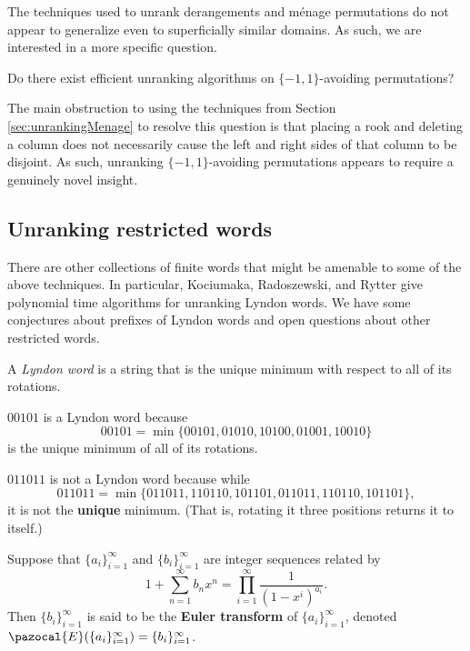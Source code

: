 The techniques used to unrank derangements and m\'enage permutations do
not appear to generalize even to superficially similar domains.
As such, we are interested in a more specific question.
\begin{openquestion}
  Do there exist efficient unranking algorithms on $\{-1, 1\}$-avoiding
  permutations?
\end{openquestion}

The main obstruction to using the techniques from
Section \ref{sec:unrankingMenage} to resolve this question is that placing
a rook and deleting a column does not necessarily cause the left and right
sides of that column to be disjoint. As such, unranking $\{-1,1\}$-avoiding
permutations appears to require a genuinely novel insight.

\subsection{Unranking restricted words}
There are other collections of finite words that might be amenable to some of
the above techniques. In particular, Kociumaka, Radoszewski, and Rytter
\cite{Kociumaka2014} give polynomial time algorithms for unranking Lyndon
words. We have some conjectures about prefixes of Lyndon words and open
questions about other restricted words.
\begin{definition}
  A \textit{Lyndon word} is a string that is the unique minimum with respect
  to all of its rotations.
\end{definition}
\begin{example}
  $00101$ is a Lyndon word because \[
    00101 = \min\{00101, 01010, 10100, 01001, 10010\}
  \] is the unique minimum of all of its rotations.

  $011011$ is not a Lyndon word because while \[
    011011 = \min\{011011, 110110, 101101, 011011, 110110, 101101\},
  \]
  it is not the \textbf{unique} minimum.
  (That is, rotating it three positions returns it to itself.)
\end{example}

\begin{definition}
  Suppose that $\{a_i\}_{i=1}^\infty$ and $\{b_i\}_{i=1}^\infty$ are integer sequences
  related by \[
    1 + \sum_{n=1}^\infty b_n x^n = \prod_{i=1}^\infty \frac{1}{(1-x^i)^{a_i}}.
  \] Then $\{b_i\}_{i=1}^\infty$ is said to be the
  \textbf{Euler transform} of $\{a_i\}_{i=1}^\infty$, denoted
  $\pazocal{E}(\{a_i\}_{i=1}^\infty) = \{b_i\}_{i=1}^\infty$.
\end{definition}

